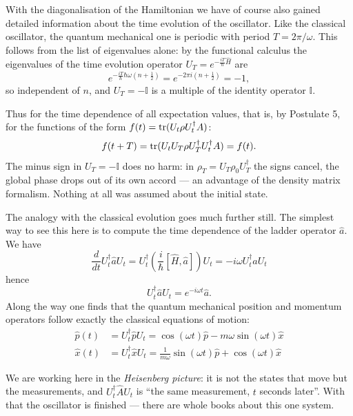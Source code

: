 With the diagonalisation of the Hamiltonian we have of course also gained detailed information about the time evolution of the oscillator. Like the classical oscillator, the quantum mechanical one is periodic with period $T = 2\pi/\omega$. This follows from the list of eigenvalues alone: by the functional calculus the eigenvalues of the time evolution operator $U_T = e^{-\frac{iT}{\hbar} \widehat{H}}$ are
\begin{equation}
	e^{-\frac{iT}{\hbar} \hbar\omega(n+\frac12)} = e^{-2\pi i (n+\frac12)} = -1,
\end{equation}
so independent of $n$, and $U_T = -\mathbb{I}$ is a multiple of the identity operator $\mathbb{I}$.

Thus for the time dependence of all expectation values, that is, by Postulate 5, for the functions of the form $f(t) = \operatorname{tr}(U_t \rho U_t^\dag A)$:
\begin{equation}
	f(t+T) = \operatorname{tr}(U_tU_T \rho U_T^\dag U_t^\dag A) =f(t).
\end{equation}	
The minus sign in $U_T = -\mathbb{I}$ does no harm: in $\rho_T = U_T\rho_0U_T^\dag$ the signs cancel, the global phase drops out of its own accord --- an advantage of the density matrix formalism. Nothing at all was assumed about the initial state.

The analogy with the classical evolution goes much further still. The simplest way to see this here is to compute the time dependence of the ladder operator $\widehat{a}$. We have 
\begin{equation}
	\frac{d}{dt} U_t^\dag \widehat{a} U_t = U_t^\dag \left(\frac{i}{\hbar} [\widehat{H},\widehat{a}] \right) U_t = -i\omega U_t^\dag \widehat{a} U_t
\end{equation}
hence
\begin{equation}
	U_t^\dag \widehat{a} U_t = e^{-i\omega t}\widehat{a}.
\end{equation}
Along the way one finds that the quantum mechanical position and momentum operators follow exactly the classical equations of motion:
\begin{equation}
	\begin{split}
		\widehat{p}(t) &= U_t^\dag \widehat{p} U_t  = \cos(\omega t) \widehat{p}  - m\omega\sin(\omega t) \widehat{x} \\
		\widehat{x}(t) &= U_t^\dag \widehat{x} U_t  = \frac{1}{m\omega}\sin(\omega t) \widehat{p}  + \cos(\omega t) \widehat{x}
	\end{split}
\end{equation}

We are working here in the \emph{Heisenberg picture}: it is not the states that move but the measurements, and $U_t^\dag \widehat{A} U_t$ is ``the same measurement, $t$ seconds later''. With that the oscillator is finished --- there are whole books about this one system.

